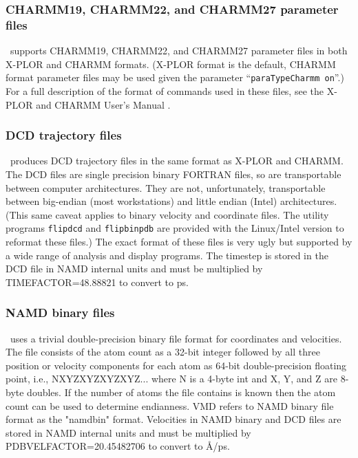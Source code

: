 \subsubsection{CHARMM19, CHARMM22, and CHARMM27 parameter files}

\NAMD\ supports CHARMM19, CHARMM22, and CHARMM27 parameter files in both
X-PLOR and CHARMM formats.
(X-PLOR format is the default, CHARMM format parameter files
may be used given the parameter ``{\tt paraTypeCharmm on}''.)
For a full description of the format of commands 
used in these files, see the X-PLOR and CHARMM User's Manual 
.  

\subsubsection{DCD trajectory files}

\NAMD\ produces DCD trajectory files in the same format as 
X-PLOR and CHARMM.  
The DCD files are single precision binary FORTRAN files, 
so are transportable between computer architectures.  
They are not, unfortunately, transportable between big-endian (most
workstations) and little endian (Intel) architectures.
(This same caveat applies to binary velocity and coordinate files.
The utility programs {\tt flipdcd} and {\tt flipbinpdb} are
provided with the Linux/Intel version to reformat these files.)
The exact format of these files is very ugly but supported by 
a wide range of analysis and display programs.  
The timestep is stored in the DCD file in NAMD internal units
and must be multiplied by TIMEFACTOR=48.88821 to convert to ps.

\subsubsection{NAMD binary files}

\NAMD\ uses a trivial double-precision binary file format for
coordinates and velocities.  The file consists of the atom count
as a 32-bit integer followed by all three position or velocity
components for each atom as 64-bit double-precision floating point,
i.e., NXYZXYZXYZXYZ... where N is a 4-byte int and X, Y, and Z
are 8-byte doubles.  If the number of atoms the file contains is
known then the atom count can be used to determine endianness.
VMD refers to NAMD binary file format as the "namdbin" format.
Velocities in NAMD binary and DCD files are stored in NAMD internal
units and must be multiplied by PDBVELFACTOR=20.45482706
to convert to \AA/ps.

